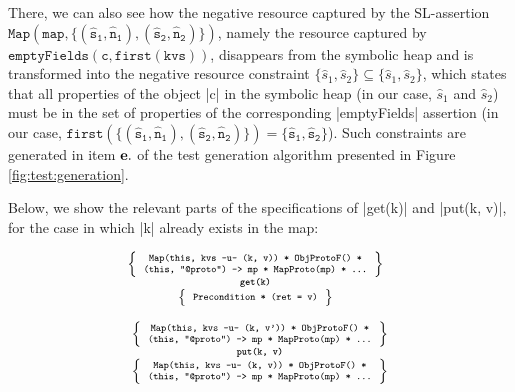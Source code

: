 There, we can also see how the negative resource captured by the SL-assertion {\small$\mathtt{Map(map, \{ (\hat{s}_1, \hat{n}_1), (\hat{s}_2, \hat{n}_2) \} )}$}, namely the resource captured by {\small$\mathtt{emptyFields(c, first(kvs))}$}, disappears from the symbolic heap and is transformed into the negative resource constraint $\{ \hat{s}_1, \hat{s}_2 \} \subseteq \{ \hat{s}_1, \hat{s}_2 \}$, which states that all properties of the object \jsinline|c| in the symbolic heap (in our case, $\hat{s}_1$ and $\hat{s}_2$) must be in the set of properties of the corresponding \jsinline|emptyFields| assertion (in our case, {\small$\mathtt{first(\{ (\hat{s}_1, \hat{n}_1), (\hat{s}_2, \hat{n}_2) \}) = \{ \hat{s}_1, \hat{s}_2 \}}$}).
Such constraints are generated in item ${\bf e.}$ of the test generation algorithm presented in Figure \ref{fig:test:generation}. 

Below, we show the relevant parts of the specifications of \jsinline|get(k)| and \jsinline|put(k, v)|, for the case in which
 \jsinline|k| already exists in the map:

\noindent
\begin{minipage}{0.475\textwidth}
\begin{displaymath} 
{\scriptsize
\hspace*{-0.2cm}
\begin{array}{c}
\left\{ {\begin{array}{c}
 \text{\texttt{Map(this, kvs -u- (k, v)) * ObjProtoF() *}} \\
 \text{\texttt{(this, "@proto") -> mp * MapProto(mp) * ...}}
\end{array}} \right\} \\
%
\text{\bfseries \texttt{get(k)}} \\[0.2mm]
%
\left\{ {\begin{array}{c}
 \text{\texttt{Precondition * (ret = v)}} 
\end{array}} \right\}
\end{array}
} 
\end{displaymath}
\end{minipage}
\quad
\begin{minipage}{0.48\textwidth}
%
\begin{displaymath} 
{\scriptsize
\begin{array}{c}
\left\{ {\begin{array}{c}
 \text{\texttt{Map(this, kvs -u- (k, v')) * ObjProtoF() *}} \\
 \text{\texttt{(this, "@proto") -> mp * MapProto(mp) * ...}}
\end{array}} \right\} \\
%
\text{\bfseries \texttt{put(k, v)}} \\[0.2mm]
%
\left\{ {\begin{array}{c}
 \text{\texttt{Map(this, kvs -u- (k, v)) * ObjProtoF() *}} \\
 \text{\texttt{(this, "@proto") -> mp * MapProto(mp) * ...}}
\end{array}} \right\}
\end{array}
} 
\end{displaymath}
\end{minipage}

